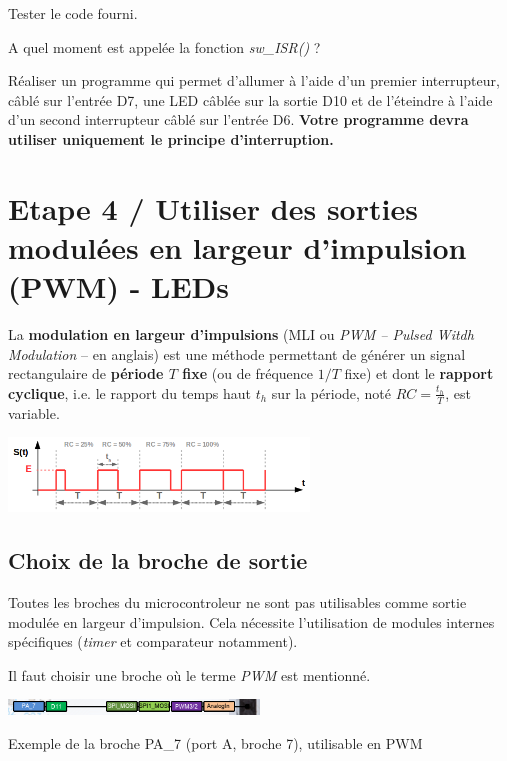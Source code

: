 \documentclass[a4paper,11pt,titlepage]{article} %
\begin{document}
\Manip Tester le code fourni. 

\Quest A quel moment est appelée la fonction \textsl{sw\_ISR()} ?

\Manip Réaliser un programme qui permet d'allumer à l'aide d'un premier interrupteur, câblé sur l'entrée D7, une LED câblée sur la sortie D10 et de l'éteindre à l'aide d'un second interrupteur câblé sur l'entrée D6. \textbf{Votre programme devra utiliser uniquement le principe d'interruption.}


\newpage
\section{Etape 4 / Utiliser des sorties modulées en largeur d'impulsion (PWM) - LEDs}

La \textbf{modulation en largeur d'impulsions} (MLI ou \textit{PWM – Pulsed Witdh Modulation} – en anglais) est une méthode permettant de générer un signal rectangulaire de \textbf{période $T$ fixe} (ou de fréquence $1/T$ fixe) et dont le \textbf{rapport cyclique}, i.e. le rapport du temps haut $t_h$ sur la période, noté $RC = \frac{t_
h}{T}$, est variable.

\begin{center}
	\includegraphics[width=0.6\textwidth]{images/MINE_ElecNum_PWM_SignalPrincipe.png}
\end{center}

\subsection{Choix de la broche de sortie}

Toutes les broches du microcontroleur ne sont pas utilisables comme sortie modulée en largeur d'impulsion. Cela nécessite l'utilisation de modules internes spécifiques (\textit{timer} et comparateur notamment).

Il faut choisir une broche où le terme \textit{PWM} est mentionné.

\begin{center}
	\includegraphics[width=0.5\textwidth]{images/nucleo_pin_functions.png}
	
	Exemple de la broche PA\_7 (port A, broche 7), utilisable en PWM
\end{center}
\end{document}
